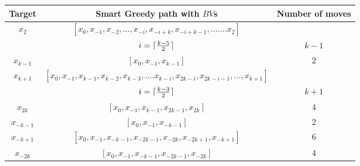 \begin{center}
  \begin{tabular}{|c|c|c|}
 \hline
 Target & Smart Greedy path with $BV$s & Number of moves\\

 \hline
$x_2$ &$[x_0, x_{-1}, x_{-2},\ldots, x_{-i},x_{-i+k}, x_{-i+k-1},\ldots.... x_2]$ &\\
&$i =  \lceil{{ k-5} \over 2}\rceil$    & $k-1$\\
\hline
 $x_{k-1}$ & $[x_0, x_{-1}, x_{k-1}]$ & $2$ \\

 \hline
 $x_{k+1}$ &  $[x_0, x_{-1}, x_{k-1}, x_{k-2}, x_{k-3},.... x_{k-i}, x_{2k-i}, x_{2k-i-1}, \ldots, x_{k+1}]$ &\\
    &  $i = \lceil{{ k-3} \over 2}\rceil$  & $k+1$\\  
 
 \hline
 $x_{2k}$ & $[x_0, x_{-1}, x_{k-1}, x_{2k-1},x_{2k}]$ & $4$ \\ %
              

\hline

$x_{-k-1}$ &$[x_0, x_{-1}, x_{-k-1}]$ & $2$ \\

\hline
 $x_{-k+1}$ & $[x_0, x_{-1}, x_{-k-1}, x_{-2k-1}, x_{-2k}, x_{-2k+1}, x_{-k+1}]$ & $6$ \\

 \hline
 $x_{-2k}$ &  $[x_0, x_{-1}, x_{-k-1}, x_{-2k-1},x_{-2k}]$ & $4$ \\

 

\hline
\end{tabular} 
\label{smart-path2}

 \end{center}

